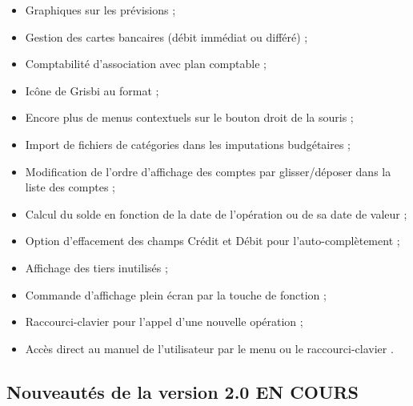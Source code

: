\begin{itemize}
	\item Graphiques sur les prévisions ;
	\item Gestion des cartes bancaires (débit immédiat ou différé) ;
	\item Comptabilité d'association avec plan comptable ;
	\item Icône de Grisbi au format  ;
	\item Encore plus de menus contextuels sur le bouton droit de la souris ;
	\item Import de fichiers de catégories dans les imputations budgétaires ;
	\item Modification de l'ordre d'affichage des comptes par glisser/déposer dans la liste des comptes ;
	\item Calcul du solde en fonction de la date de l'opération ou de sa date de valeur ;
	\item Option d'effacement des champs Crédit et Débit pour l'auto-complètement ;
	\item Affichage des tiers inutilisés ;
	\item Commande d'affichage plein écran par la touche de fonction  ;
	\item Raccourci-clavier  pour l'appel d'une nouvelle opération ;
	\item Accès direct au manuel de l'utilisateur par le menu  ou le raccourci-clavier .
\end{itemize}


\subsection{Nouveautés de la version 2.0 EN COURS }

